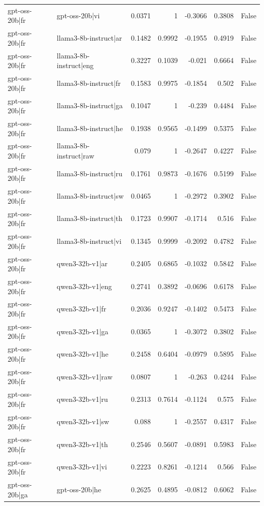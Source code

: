 \begin{table}
\begin{tabular}{l l r r r r l}
gpt-oss-20b|fr & gpt-oss-20b|vi & 0.0371 & 1 & -0.3066 & 0.3808 & False \\
gpt-oss-20b|fr & llama3-8b-instruct|ar & 0.1482 & 0.9992 & -0.1955 & 0.4919 & False \\
gpt-oss-20b|fr & llama3-8b-instruct|eng & 0.3227 & 0.1039 & -0.021 & 0.6664 & False \\
gpt-oss-20b|fr & llama3-8b-instruct|fr & 0.1583 & 0.9975 & -0.1854 & 0.502 & False \\
gpt-oss-20b|fr & llama3-8b-instruct|ga & 0.1047 & 1 & -0.239 & 0.4484 & False \\
gpt-oss-20b|fr & llama3-8b-instruct|he & 0.1938 & 0.9565 & -0.1499 & 0.5375 & False \\
gpt-oss-20b|fr & llama3-8b-instruct|raw & 0.079 & 1 & -0.2647 & 0.4227 & False \\
gpt-oss-20b|fr & llama3-8b-instruct|ru & 0.1761 & 0.9873 & -0.1676 & 0.5199 & False \\
gpt-oss-20b|fr & llama3-8b-instruct|sw & 0.0465 & 1 & -0.2972 & 0.3902 & False \\
gpt-oss-20b|fr & llama3-8b-instruct|th & 0.1723 & 0.9907 & -0.1714 & 0.516 & False \\
gpt-oss-20b|fr & llama3-8b-instruct|vi & 0.1345 & 0.9999 & -0.2092 & 0.4782 & False \\
gpt-oss-20b|fr & qwen3-32b-v1|ar & 0.2405 & 0.6865 & -0.1032 & 0.5842 & False \\
gpt-oss-20b|fr & qwen3-32b-v1|eng & 0.2741 & 0.3892 & -0.0696 & 0.6178 & False \\
gpt-oss-20b|fr & qwen3-32b-v1|fr & 0.2036 & 0.9247 & -0.1402 & 0.5473 & False \\
gpt-oss-20b|fr & qwen3-32b-v1|ga & 0.0365 & 1 & -0.3072 & 0.3802 & False \\
gpt-oss-20b|fr & qwen3-32b-v1|he & 0.2458 & 0.6404 & -0.0979 & 0.5895 & False \\
gpt-oss-20b|fr & qwen3-32b-v1|raw & 0.0807 & 1 & -0.263 & 0.4244 & False \\
gpt-oss-20b|fr & qwen3-32b-v1|ru & 0.2313 & 0.7614 & -0.1124 & 0.575 & False \\
gpt-oss-20b|fr & qwen3-32b-v1|sw & 0.088 & 1 & -0.2557 & 0.4317 & False \\
gpt-oss-20b|fr & qwen3-32b-v1|th & 0.2546 & 0.5607 & -0.0891 & 0.5983 & False \\
gpt-oss-20b|fr & qwen3-32b-v1|vi & 0.2223 & 0.8261 & -0.1214 & 0.566 & False \\
gpt-oss-20b|ga & gpt-oss-20b|he & 0.2625 & 0.4895 & -0.0812 & 0.6062 & False \\

\end{tabular}
\end{table}
